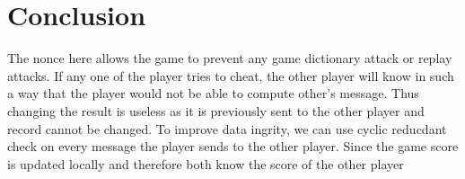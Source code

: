 \documentclass[11pt]{article}
\begin{document}
\section{Conclusion}
The nonce here allows the game to prevent any game dictionary attack or replay attacks. If any one of the player tries to cheat, the other player will know in such a way that the player would not be able to compute other's message. Thus changing the result is useless as it is previously sent to the other player and record cannot be changed. To improve data ingrity, we can use cyclic reducdant check on every message the player sends to the other player. Since the game score is updated locally and therefore both know the score of the other player
\end{document}
